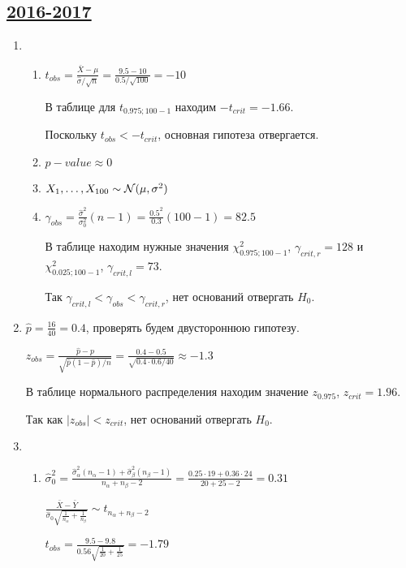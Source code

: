 


\subsection[2016-2017]{\hyperref[sec:kr_04_2016_2017]{2016-2017}}
\label{sec:sol_kr_04_2016_2017}


\begin{enumerate}
\item
\begin{enumerate}
\item $t_{obs} = \frac{\bar X - \mu}{\hat\sigma/\sqrt{n}} = \frac{9.5-10}{0.5/\sqrt{100}} = -10$

В таблице для $t_{0.975;100-1}$ находим $-t_{crit} = -1.66$.

Поскольку $t_{obs} < -t_{crit}$, основная гипотеза отвергается.
\item $p-value \approx 0$
\item $X_1, \ldots, X_{100} \sim \mathcal{N}(\mu, \sigma^2)$
\item $\gamma_{obs} = \frac{\hat{\sigma}^2}{\sigma^2_0}(n-1) =
\frac{0.5^2}{0.3}(100-1) = 82.5$

В таблице находим нужные значения $\chi^2_{0.975;100-1}$, $\gamma_{crit, r} = 128$
и $\chi^2_{0.025;100-1}$, $\gamma_{crit, l} = 73$.

Так $\gamma_{crit, l} < \gamma_{obs} < \gamma_{crit, r}$, нет оснований отвергать $H_0$.
\end{enumerate}
\item $\hat{p} = \frac{16}{40} = 0.4$, проверять будем двустороннюю гипотезу.

$z_{obs} = \frac{\hat{p} - p}{\sqrt{\hat{p}(1-\hat{p})/n}} =
\frac{0.4-0.5}{\sqrt{0.4\cdot0.6/40}} \approx -1.3$

В таблице нормального распределения находим значение $z_{0.975}$, $z_{crit} = 1.96$.

Так как $\vert z_{obs} \vert < z_{crit}$, нет оснований отвергать $H_0$.
\item
\begin{enumerate}
\item $\hat{\sigma}_0^2 = \frac{\hat{\sigma}_\alpha^2(n_\alpha -1) +
\hat{\sigma}_\beta^2(n_\beta-1)}{n_\alpha + n_\beta-2} = \frac{0.25\cdot19 + 0.36\cdot24}{20+25-2} = 0.31$

$\frac{\bar{X} - \bar{Y}}{\hat{\sigma}_0 \sqrt{\frac{1}{n_\alpha} + \frac{1}{n_\beta}}} \sim t_{n_\alpha + n_\beta-2}$

$t_{obs} = \frac{9.5-9.8}{0.56\sqrt{\frac{1}{20}+ \frac{1}{25}}} = -1.79$


\end{enumerate}
\end{enumerate}
